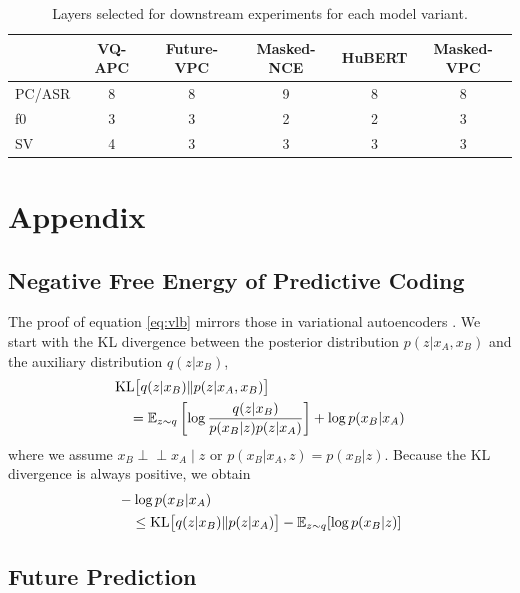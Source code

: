 \documentclass[11pt,a4paper]{article}
\newcommand{\KL}{\mathrm{KL}}
\newcommand{\ind}{\perp\!\!\!\!\perp}
\begin{document}
\balance{


}
\newpage
\nobalance
\appendix

\begin{table}[ht]
\centering
\small
\begin{tabular}{lccccc}
\toprule
 & VQ-APC & Future-VPC & Masked-NCE & HuBERT & Masked-VPC\\
\midrule
PC/ASR & 8      & 8          & 9           & 8      & 8       \\
f0 & 3      & 3          & 2           & 2      & 3       \\
SV & 4      & 3          & 3           & 3      & 3       \\
\bottomrule
\end{tabular}
\caption{Layers selected for downstream experiments for each model variant.}
\label{tab:layers}
\end{table}

\section{Appendix}

\subsection{Negative Free Energy of Predictive Coding}
\label{appendix:proof}

The proof of equation \ref{eq:vlb} mirrors those in variational autoencoders \citep{Kingma2014}.
We start with the KL divergence between the posterior distribution $p(z|x_A, x_B)$
and the auxiliary distribution $q(z|x_B)$,
\begin{align}
&\KL\big[q(z|x_B)\|p(z|x_A,x_B)\big] \\
&\quad = \mathbb{E}_{z \sim q} \left[\log \frac{q(z | x_B)}{p(x_B | z) p(z | x_A)} \right] + \log p(x_B|x_A) \notag
\label{eq:proof}
\end{align}
where we assume $x_B \ind x_A \mid z$ or $p(x_B|x_A, z) = p(x_B|z)$.
Because the KL divergence is always positive, we obtain
\begin{align}
&-\log p(x_B | x_A) \\
&\quad \leq \KL \big[q(z|x_B)\|p(z|x_A)\big] - \mathbb{E}_{z \sim q}[\log p(x_B | z)] \notag
\end{align}

\subsection{Future Prediction}
\end{document}
